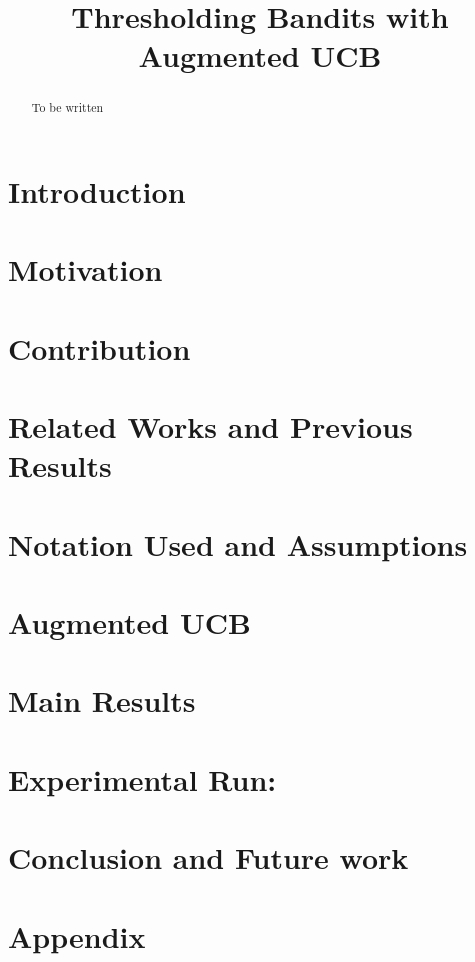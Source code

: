 \documentclass[fleqn,anon,12pt]{colt2016} %
\title[Thresholding Bandits with Augmented UCB]{Thresholding Bandits with Augmented UCB}
\begin{document}
\maketitle

\begin{abstract}
To be written
\end{abstract}


\section{Introduction}
\label{intro}


\section{Motivation}
\label{motivation}



\section{Contribution}
\label{contribution}


\section{Related Works and Previous Results}
\label{prevRes}


\section{Notation Used and Assumptions}
\label{notation}


\section{Augmented UCB}
\label{algo}


\section{Main Results}
\label{results}



\section{Experimental Run:}
\label{expt}



\section{Conclusion and Future work}
\label{conclusion}









\section{Appendix}
\label{appendix}

\end{document}
